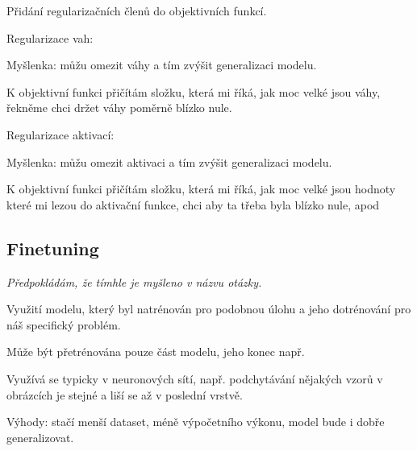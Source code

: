 \begin{compactitem}
    \item Přidání regularizačních členů do objektivních funkcí.

    \item Regularizace vah: \begin{compactitem}
        \item Myšlenka: můžu omezit váhy a tím zvýšit generalizaci modelu.

        \item K objektivní funkci přičítám složku, která mi říká, jak moc velké jsou váhy, řekněme chci držet váhy poměrně blízko nule.
    \end{compactitem}

    \item Regularizace aktivací: \begin{compactitem}
        \item Myšlenka: můžu omezit aktivaci a tím zvýšit generalizaci modelu.
        \item K objektivní funkci přičítám složku, která mi říká, jak moc velké jsou hodnoty které mi lezou do aktivační funkce, chci aby ta třeba byla blízko nule, apod
    \end{compactitem}
\end{compactitem}

\subsection{Finetuning}

\begin{compactitem}
    \item \textit{Předpokládám, že tímhle je myšleno  v názvu otázky.}

    \item Využití modelu, který byl natrénován pro podobnou úlohu a jeho dotrénování pro náš specifický problém.
    \begin{compactitem}
        \item Může být přetrénována pouze část modelu, jeho konec např.
    \end{compactitem}

    \item Využívá se typicky v neuronových sítí, např. podchytávání nějakých vzorů v obrázcích je stejné a liší se až v poslední vrstvě.

    \item Výhody: stačí menší dataset, méně výpočetního výkonu, model bude i dobře generalizovat.
\end{compactitem}

